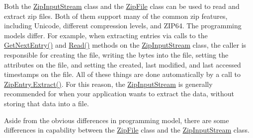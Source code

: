 Both the {\ttfamily \mbox{\hyperlink{class_super_tiled2_unity_1_1_ionic_1_1_zip_1_1_zip_input_stream}{Zip\+Input\+Stream}}} class and the {\ttfamily \mbox{\hyperlink{class_super_tiled2_unity_1_1_ionic_1_1_zip_1_1_zip_file}{Zip\+File}}} class can be used to read and extract zip files. Both of them support many of the common zip features, including Unicode, different compression levels, and Z\+I\+P64. The programming models differ. For example, when extracting entries via calls to the {\ttfamily \mbox{\hyperlink{class_super_tiled2_unity_1_1_ionic_1_1_zip_1_1_zip_input_stream_afd108d06a4650f63b0ec80d0698fc886}{Get\+Next\+Entry()}}} and {\ttfamily \mbox{\hyperlink{class_super_tiled2_unity_1_1_ionic_1_1_zip_1_1_zip_input_stream_a172a23a02d3c7a34db7c6648c55fd299}{Read()}}} methods on the {\ttfamily \mbox{\hyperlink{class_super_tiled2_unity_1_1_ionic_1_1_zip_1_1_zip_input_stream}{Zip\+Input\+Stream}}} class, the caller is responsible for creating the file, writing the bytes into the file, setting the attributes on the file, and setting the created, last modified, and last accessed timestamps on the file. All of these things are done automatically by a call to \mbox{\hyperlink{class_super_tiled2_unity_1_1_ionic_1_1_zip_1_1_zip_entry_a9d65543aadd23e47e188175412891b42}{Zip\+Entry.\+Extract()}}. For this reason, the {\ttfamily \mbox{\hyperlink{class_super_tiled2_unity_1_1_ionic_1_1_zip_1_1_zip_input_stream}{Zip\+Input\+Stream}}} is generally recommended for when your application wants to extract the data, without storing that data into a file. 

Aside from the obvious differences in programming model, there are some differences in capability between the {\ttfamily \mbox{\hyperlink{class_super_tiled2_unity_1_1_ionic_1_1_zip_1_1_zip_file}{Zip\+File}}} class and the {\ttfamily \mbox{\hyperlink{class_super_tiled2_unity_1_1_ionic_1_1_zip_1_1_zip_input_stream}{Zip\+Input\+Stream}}} class. 


